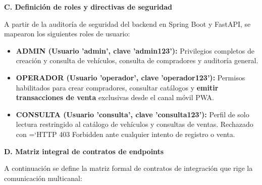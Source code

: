 \documentclass[11pt,a4paper]{article}
\renewcommand{\_}{\oldunderscore\allowbreak}
\DeclareRobustCommand{\texttt}[1]{%
  {\upshape\ttfamily\fontsize{9}{10.8}\selectfont\hyphenchar\font=`\-\relax #1}%
}
\begin{document}
\vspace{0.2cm}
\noindent\textbf{C. Definición de roles y directivas de seguridad}

\noindent A partir de la auditoría de seguridad del backend en Spring Boot y FastAPI, se mapearon los siguientes roles de usuario:
\begin{itemize}[leftmargin=*,itemsep=1pt,topsep=1pt]
  \item \textbf{ADMIN (Usuario 'admin', clave 'admin123'):} Privilegios completos de creación y consulta de vehículos, consulta de compradores y auditoría general.
  \item \textbf{OPERADOR (Usuario 'operador', clave 'operador123'):} Permisos habilitados para crear compradores, consultar catálogos y \textbf{emitir transacciones de venta} exclusivas desde el canal móvil PWA.
  \item \textbf{CONSULTA (Usuario 'consulta', clave 'consulta123'):} Perfil de solo lectura restringido al catálogo de vehículos y consultas de ventas. Rechazado con \texttt{HTTP 403 Forbidden} ante cualquier intento de registro o venta.
\end{itemize}

\vspace{0.2cm}
\noindent\textbf{D. Matriz integral de contratos de endpoints}

\noindent A continuación se define la matriz formal de contratos de integración que rige la comunicación multicanal:
\end{document}
